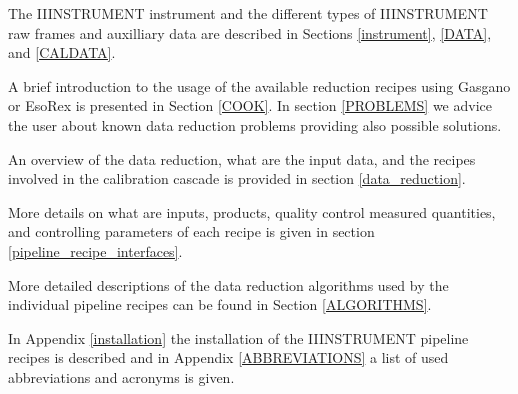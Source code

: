 

The IIINSTRUMENT instrument and the different types of IIINSTRUMENT raw frames 
and auxilliary data are described in Sections \ref{instrument}, \ref{DATA}, and \ref{CALDATA}.


A brief introduction to the usage of the available reduction recipes 
using Gasgano or EsoRex is presented in Section \ref{COOK}.
In section \ref{PROBLEMS} we advice the user 
about known data reduction problems providing also possible solutions.

An overview of the data reduction, what 
are the input data, and the recipes involved in the calibration cascade 
is provided in section \ref{data_reduction}.


More details on what are inputs, products, quality control measured quantities,
 and controlling parameters of each recipe is given 
in section \ref{pipeline_recipe_interfaces}.

More detailed descriptions of the data reduction algorithms used by
the individual pipeline recipes can be found in Section \ref{ALGORITHMS}.


In Appendix \ref{installation} the installation of the IIINSTRUMENT pipeline 
recipes is described and 
in Appendix \ref{ABBREVIATIONS} a list of used abbreviations and acronyms 
is given.

